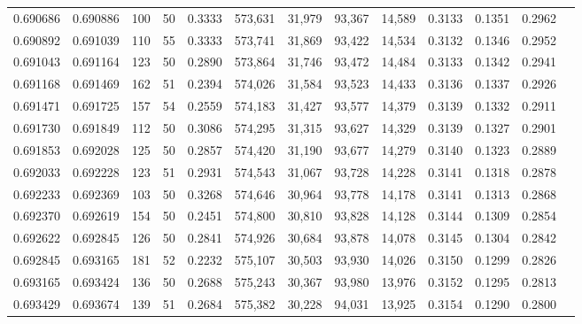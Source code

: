 \begin{tabular}{rrrrrrrrrrrrr}
0.690686 & 0.690886 &   100 &  50 &                                     0.3333 & 573,631 &  31,979 &  93,367 &  14,589 & 0.3133 & 0.1351 & 0.2962 \\
0.690892 & 0.691039 &   110 &  55 &                                     0.3333 & 573,741 &  31,869 &  93,422 &  14,534 & 0.3132 & 0.1346 & 0.2952 \\
0.691043 & 0.691164 &   123 &  50 &                                     0.2890 & 573,864 &  31,746 &  93,472 &  14,484 & 0.3133 & 0.1342 & 0.2941 \\
0.691168 & 0.691469 &   162 &  51 &                                     0.2394 & 574,026 &  31,584 &  93,523 &  14,433 & 0.3136 & 0.1337 & 0.2926 \\
0.691471 & 0.691725 &   157 &  54 &                                     0.2559 & 574,183 &  31,427 &  93,577 &  14,379 & 0.3139 & 0.1332 & 0.2911 \\
0.691730 & 0.691849 &   112 &  50 &                                     0.3086 & 574,295 &  31,315 &  93,627 &  14,329 & 0.3139 & 0.1327 & 0.2901 \\
0.691853 & 0.692028 &   125 &  50 &                                     0.2857 & 574,420 &  31,190 &  93,677 &  14,279 & 0.3140 & 0.1323 & 0.2889 \\
0.692033 & 0.692228 &   123 &  51 &                                     0.2931 & 574,543 &  31,067 &  93,728 &  14,228 & 0.3141 & 0.1318 & 0.2878 \\
0.692233 & 0.692369 &   103 &  50 &                                     0.3268 & 574,646 &  30,964 &  93,778 &  14,178 & 0.3141 & 0.1313 & 0.2868 \\
0.692370 & 0.692619 &   154 &  50 &                                     0.2451 & 574,800 &  30,810 &  93,828 &  14,128 & 0.3144 & 0.1309 & 0.2854 \\
0.692622 & 0.692845 &   126 &  50 &                                     0.2841 & 574,926 &  30,684 &  93,878 &  14,078 & 0.3145 & 0.1304 & 0.2842 \\
0.692845 & 0.693165 &   181 &  52 &                                     0.2232 & 575,107 &  30,503 &  93,930 &  14,026 & 0.3150 & 0.1299 & 0.2826 \\
0.693165 & 0.693424 &   136 &  50 &                                     0.2688 & 575,243 &  30,367 &  93,980 &  13,976 & 0.3152 & 0.1295 & 0.2813 \\
0.693429 & 0.693674 &   139 &  51 &                                     0.2684 & 575,382 &  30,228 &  94,031 &  13,925 & 0.3154 & 0.1290 & 0.2800 \\

\end{tabular}
